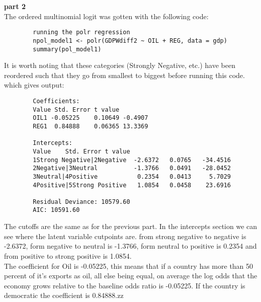 \documentclass{article}
\begin{document}
	
	\textbf{part 2\\}
	The ordered multinomial logit was gotten with the following code:
	\begin{verbatim}
		running the polr regression
		npol_model1 <- polr(GDPWdiff2 ~ OIL + REG, data = gdp)
		summary(pol_model1)
	\end{verbatim}
	It is worth noting that these categories (Strongly Negative, etc.) have been reordered such that they go from smallest to biggest before running this code. which gives output:
	\begin{verbatim}
		Coefficients:
		Value Std. Error t value
		OIL1 -0.05225    0.10649 -0.4907
		REG1  0.84888    0.06365 13.3369
		
		Intercepts:
		Value    Std. Error t value
		1Strong Negative|2Negative  -2.6372   0.0765   -34.4516
		2Negative|3Neutral          -1.3766   0.0491   -28.0452
		3Neutral|4Positive           0.2354   0.0413     5.7029
		4Positive|5Strong Positive   1.0854   0.0458    23.6916
		
		Residual Deviance: 10579.60
		AIC: 10591.60 
	\end{verbatim}
	The cutoffs are the same as for the previous part. In the intercepts section we can see where the latent variable cutpoints are. from strong negative to negative is -2.6372, form negative to neutral is -1.3766, form neutral to positive is 0.2354 and from positive to strong positive is 1.0854.\\
	The coefficient for Oil is -0.05225, this means that if a country has more than 50 percent of it's exports as oil, all else being equal, on average the log odds that the economy grows relative to the baseline odds ratio is -0.05225. If the country is democratic the coefficient is 0.84888.zz
	\clearpage
	
	
	
\end{document}
